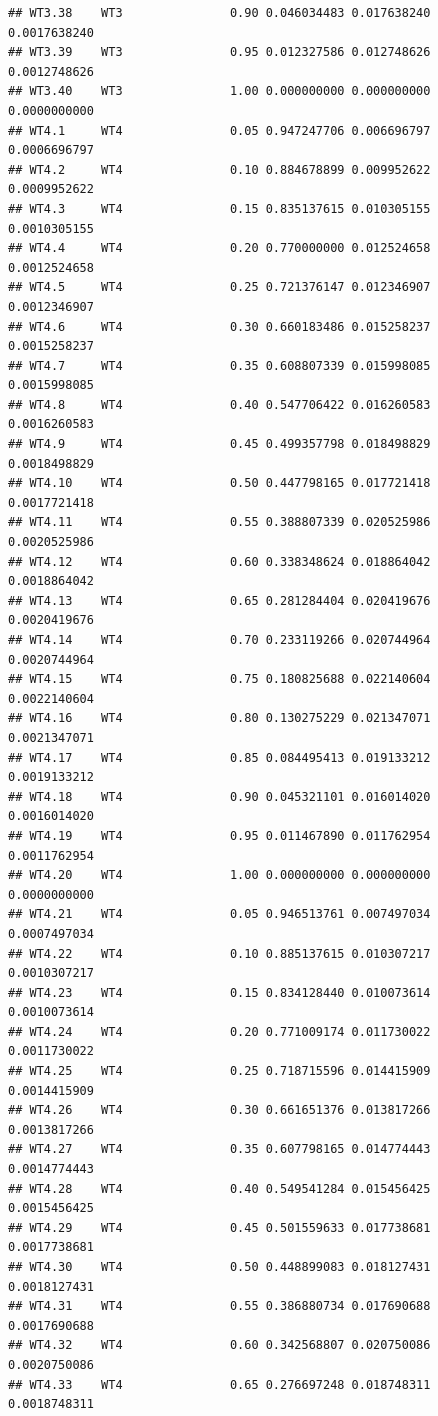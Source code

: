 \documentclass[
]{book}
\begin{document}
\begin{verbatim}
## WT3.38    WT3               0.90 0.046034483 0.017638240 0.0017638240
## WT3.39    WT3               0.95 0.012327586 0.012748626 0.0012748626
## WT3.40    WT3               1.00 0.000000000 0.000000000 0.0000000000
## WT4.1     WT4               0.05 0.947247706 0.006696797 0.0006696797
## WT4.2     WT4               0.10 0.884678899 0.009952622 0.0009952622
## WT4.3     WT4               0.15 0.835137615 0.010305155 0.0010305155
## WT4.4     WT4               0.20 0.770000000 0.012524658 0.0012524658
## WT4.5     WT4               0.25 0.721376147 0.012346907 0.0012346907
## WT4.6     WT4               0.30 0.660183486 0.015258237 0.0015258237
## WT4.7     WT4               0.35 0.608807339 0.015998085 0.0015998085
## WT4.8     WT4               0.40 0.547706422 0.016260583 0.0016260583
## WT4.9     WT4               0.45 0.499357798 0.018498829 0.0018498829
## WT4.10    WT4               0.50 0.447798165 0.017721418 0.0017721418
## WT4.11    WT4               0.55 0.388807339 0.020525986 0.0020525986
## WT4.12    WT4               0.60 0.338348624 0.018864042 0.0018864042
## WT4.13    WT4               0.65 0.281284404 0.020419676 0.0020419676
## WT4.14    WT4               0.70 0.233119266 0.020744964 0.0020744964
## WT4.15    WT4               0.75 0.180825688 0.022140604 0.0022140604
## WT4.16    WT4               0.80 0.130275229 0.021347071 0.0021347071
## WT4.17    WT4               0.85 0.084495413 0.019133212 0.0019133212
## WT4.18    WT4               0.90 0.045321101 0.016014020 0.0016014020
## WT4.19    WT4               0.95 0.011467890 0.011762954 0.0011762954
## WT4.20    WT4               1.00 0.000000000 0.000000000 0.0000000000
## WT4.21    WT4               0.05 0.946513761 0.007497034 0.0007497034
## WT4.22    WT4               0.10 0.885137615 0.010307217 0.0010307217
## WT4.23    WT4               0.15 0.834128440 0.010073614 0.0010073614
## WT4.24    WT4               0.20 0.771009174 0.011730022 0.0011730022
## WT4.25    WT4               0.25 0.718715596 0.014415909 0.0014415909
## WT4.26    WT4               0.30 0.661651376 0.013817266 0.0013817266
## WT4.27    WT4               0.35 0.607798165 0.014774443 0.0014774443
## WT4.28    WT4               0.40 0.549541284 0.015456425 0.0015456425
## WT4.29    WT4               0.45 0.501559633 0.017738681 0.0017738681
## WT4.30    WT4               0.50 0.448899083 0.018127431 0.0018127431
## WT4.31    WT4               0.55 0.386880734 0.017690688 0.0017690688
## WT4.32    WT4               0.60 0.342568807 0.020750086 0.0020750086
## WT4.33    WT4               0.65 0.276697248 0.018748311 0.0018748311

\end{verbatim}
\end{document}
